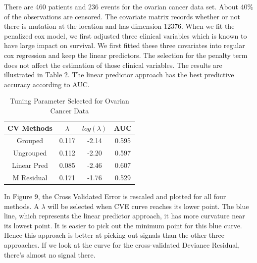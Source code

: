 \documentclass{article}\usepackage[]{graphicx}\usepackage[]{color}
\begin{document}
There are 460 patients and 236 events for the ovarian cancer data set. About 40$\%$ of the observations are censored. The covariate matrix records whether or not there is mutation at the location and has dimension 12376. When we fit the penalized cox model, we first adjusted three clinical variables which is known to have large impact on survival. We first fitted these three covariates into regular cox regression and keep the linear predictors. The selection for the penalty term does not affect the estimation of those clinical variables. The results are illustrated in Table 2. The linear predictor approach has the best predictive accuracy according to AUC. 

\begin{table}[h]
\centering
  \begin{tabular}{ c | c | c | c}
				CV Methods & $\lambda$ & $log(\lambda)$ &AUC \\
				\hline \hline
				Grouped  &  0.117 & -2.14 &   0.595\\
				Ungrouped &  0.112 & -2.20 &  0.597\\
				Linear Pred &  0.085 & -2.46 &     0.607\\
				M Residual & 0.171 & -1.76 & 0.529 
	\end{tabular}
  \caption{Tuning Parameter Selected for Ovarian Cancer Data}
\end{table}


In Figure 9, the Cross Validated Error is rescaled and plotted for all four methods. A $\lambda$ will be selected when CVE curve reaches its lower point. The blue line, which represents the linear predictor approach, it has more curvature near its lowest point. It is easier to pick out the minimum point for this blue curve. Hence this approach is better at picking out signals than the other three approaches. If we look at the curve for the cross-validated Deviance Residual, there's almost no signal there.
\end{document}
